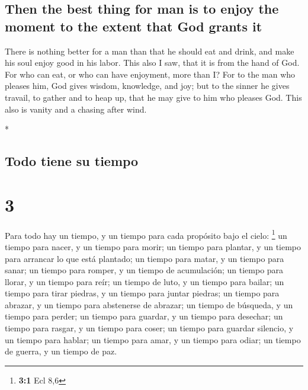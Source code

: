 \begin{paracol}{2}
\begin{otherlanguage}{english}
\hypertarget{then-the-best-thing-for-man-is-to-enjoy-the-moment-to-the-extent-that-god-grants-it}{%
\subsection{Then the best thing for man is to enjoy the moment to the
extent that God grants
it}\label{then-the-best-thing-for-man-is-to-enjoy-the-moment-to-the-extent-that-god-grants-it}}

 There is nothing better for a man than that he should
eat and drink, and make his soul enjoy good in his labor. This also I
saw, that it is from the hand of God.  For who can eat,
or who can have enjoyment, more than I?  For to the man
who pleases him, God gives wisdom, knowledge, and joy; but to the sinner
he gives travail, to gather and to heap up, that he may give to him who
pleases God. This also is vanity and a chasing after wind.

\end{otherlanguage}

\switchcolumn[0]*

\hypertarget{todo-tiene-su-tiempo}{%
\subsection{Todo tiene su tiempo}\label{todo-tiene-su-tiempo}}

\hypertarget{section-4}{%
\section{3}\label{section-4}}

 Para todo hay un tiempo, y un tiempo para cada propósito
bajo el cielo: \footnote{\textbf{3:1} Ecl 8,6}  un tiempo
para nacer, y un tiempo para morir; un tiempo para plantar, y un tiempo
para arrancar lo que está plantado;  un tiempo para matar,
y un tiempo para sanar; un tiempo para romper, y un tiempo de
acumulación;  un tiempo para llorar, y un tiempo para
reír; un tiempo de luto, y un tiempo para bailar;  un
tiempo para tirar piedras, y un tiempo para juntar piedras; un tiempo
para abrazar, y un tiempo para abstenerse de abrazar;  un
tiempo de búsqueda, y un tiempo para perder; un tiempo para guardar, y
un tiempo para desechar;  un tiempo para rasgar, y un
tiempo para coser; un tiempo para guardar silencio, y un tiempo para
hablar;  un tiempo para amar, y un tiempo para odiar; un
tiempo de guerra, y un tiempo de paz.


\end{paracol}
